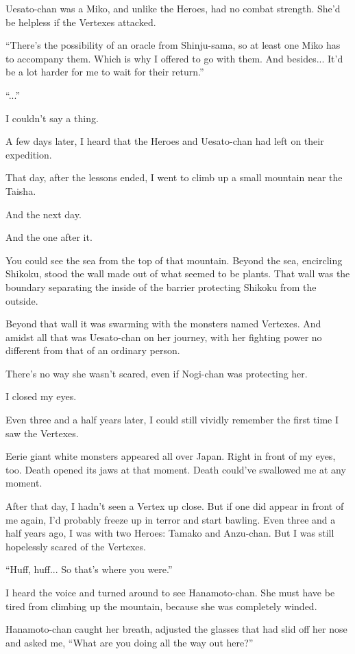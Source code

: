 Uesato-chan was a Miko, and unlike the Heroes, had no combat strength. She'd be helpless if the Vertexes attacked.

``There's the possibility of an oracle from Shinju-sama, so at least one Miko has to accompany them. Which is why I offered to go with them. And besides... It'd be a lot harder for me to wait for their return.''

``...''

I couldn't say a thing.

A few days later, I heard that the Heroes and Uesato-chan had left on their expedition.

That day, after the lessons ended, I went to climb up a small mountain near the Taisha.

And the next day.

And the one after it.

You could see the sea from the top of that mountain. Beyond the sea, encircling Shikoku, stood the wall made out of what seemed to be plants. That wall was the boundary separating the inside of the barrier protecting Shikoku from the outside.

Beyond that wall it was swarming with the monsters named Vertexes. And amidst all that was Uesato-chan on her journey, with her fighting power no different from that of an ordinary person.

There's no way she wasn't scared, even if Nogi-chan was protecting her.

I closed my eyes.

Even three and a half years later, I could still vividly remember the first time I saw the Vertexes.

Eerie giant white monsters appeared all over Japan. Right in front of my eyes, too. Death opened its jaws at that moment. Death could've swallowed me at any moment.

After that day, I hadn't seen a Vertex up close. But if one did appear in front of me again, I'd probably freeze up in terror and start bawling. Even three and a half years ago, I was with two Heroes: Tamako and Anzu-chan. But I was still hopelessly scared of the Vertexes.

``Huff, huff... So that's where you were.''

I heard the voice and turned around to see Hanamoto-chan. She must have be tired from climbing up the mountain, because she was completely winded.

Hanamoto-chan caught her breath, adjusted the glasses that had slid off her nose and asked me, ``What are you doing all the way out here?''


